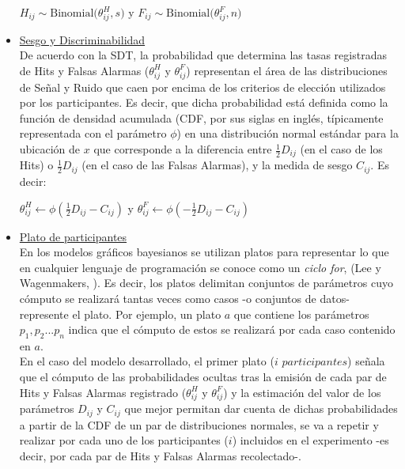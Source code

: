 \begin{itemize}
\begin{center}
$H_{ij}\sim \mathrm{Binomial}\bigl(\theta^H_{ij}, s)$
y
$F_{ij}\sim \mathrm{Binomial}\bigl(\theta^F_{ij}, n)$\\
\end{center}

\item \underline{Sesgo y Discriminabilidad}\\

De acuerdo con la SDT, la probabilidad que determina las tasas registradas de Hits y Falsas Alarmas ($\theta^H_{ij}$ y $\theta^F_{ij}$) representan el área de las distribuciones de Señal y Ruido que caen por encima de los criterios de elección utilizados por los participantes. Es decir, que dicha probabilidad está definida como la función de densidad acumulada (CDF, por sus siglas en inglés, típicamente representada con el parámetro $\phi$) en una distribución normal estándar para la ubicación de $x$ que corresponde a la diferencia entre $\frac{1}{2}D_{ij}$ (en el caso de los Hits) o $\frac{1}{2}D_{ij}$ (en el caso de las Falsas Alarmas), y la medida de sesgo $C_{ij}$. Es decir:\\

\begin{center}
$\theta^H_{ij}\gets \phi (\frac{1}{2}D_{ij}-C_{ij})$
y
$\theta^F_{ij}\gets \phi (-\frac{1}{2}D_{ij}-C_{ij})$\\
\end{center}

\CONSIDERAR \AGREGAR \UNA \FIGURA \ILUSTRATIVA

\item \underline{Plato de participantes}\\

En los modelos gráficos bayesianos se utilizan platos para representar lo que en cualquier lenguaje de programación se conoce como un \textit{ciclo for}, (Lee y Wagenmakers, \citeyear{LeeBook}). Es decir, los platos delimitan conjuntos de parámetros cuyo cómputo se realizará tantas veces como casos -o conjuntos de datos- represente el plato. Por ejemplo, un plato $a$ que contiene los parámetros $p_1, p_2... p_n$ indica que el cómputo de estos se realizará por cada caso contenido en $a$.\\

En el caso del modelo desarrollado, el primer plato ($i$ $participantes$) señala que el cómputo de las probabilidades ocultas tras la emisión de cada par de Hits y Falsas Alarmas registrado ($\theta^H_{ij}$ y $\theta^F_{ij}$) y la estimación del valor de los parámetros $D_{ij}$ y $C_{ij}$ que mejor permitan dar cuenta de dichas probabilidades a partir de la CDF de un par de distribuciones normales, se va a repetir y realizar por cada uno de los participantes ($i$) incluidos en el experimento -es decir, por cada par de Hits y Falsas Alarmas recolectado-.\\


\end{itemize}
